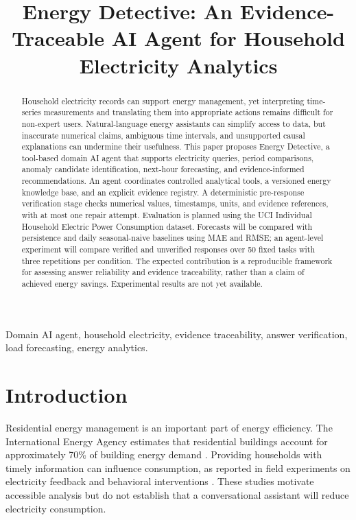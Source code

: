 \documentclass[conference]{IEEEtran}
\newcommand{\project}{Energy Detective}
\begin{document}
\title{Energy Detective: An Evidence-Traceable AI Agent for Household Electricity Analytics}
\author{}
\maketitle

\begin{abstract}
Household electricity records can support energy management, yet interpreting time-series measurements and translating them into appropriate actions remains difficult for non-expert users. Natural-language energy assistants can simplify access to data, but inaccurate numerical claims, ambiguous time intervals, and unsupported causal explanations can undermine their usefulness. This paper proposes \project, a tool-based domain AI agent that supports electricity queries, period comparisons, anomaly candidate identification, next-hour forecasting, and evidence-informed recommendations. An agent coordinates controlled analytical tools, a versioned energy knowledge base, and an explicit evidence registry. A deterministic pre-response verification stage checks numerical values, timestamps, units, and evidence references, with at most one repair attempt. Evaluation is planned using the UCI Individual Household Electric Power Consumption dataset. Forecasts will be compared with persistence and daily seasonal-naive baselines using MAE and RMSE; an agent-level experiment will compare verified and unverified responses over 50 fixed tasks with three repetitions per condition. The expected contribution is a reproducible framework for assessing answer reliability and evidence traceability, rather than a claim of achieved energy savings. Experimental results are not yet available.
\end{abstract}
\begin{IEEEkeywords}
Domain AI agent, household electricity, evidence traceability, answer verification, load forecasting, energy analytics.
\end{IEEEkeywords}

\section{Introduction}
Residential energy management is an important part of energy efficiency. The International Energy Agency estimates that residential buildings account for approximately 70\% of building energy demand \cite{iea2025}. Providing households with timely information can influence consumption, as reported in field experiments on electricity feedback and behavioral interventions \cite{boomsma2025,paunov2026}. These studies motivate accessible analysis but do not establish that a conversational assistant will reduce electricity consumption.
\end{document}
